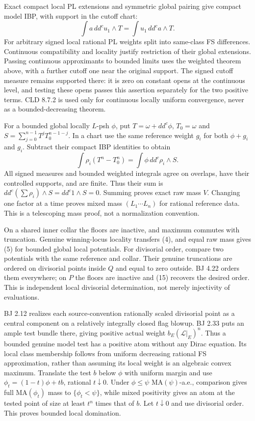 \documentclass[
  10pt,
]{article}
\begin{document}
Exact compact local PL extensions and symmetric global pairing give
compact model IBP, with support in the cutoff chart:
\[\int a\,dd^cu_1\wedge T=\int u_1\,dd^ca\wedge T. \tag{17}\] For
arbitrary signed local rational PL weights split into same-class FS
differences. Continuous compatibility and locality justify restriction
of their global extensions. Passing continuous approximants to bounded
limits uses the weighted theorem above, with a further cutoff one near
the original support. The signed cutoff measure remains supported there:
it is zero on constant opens at the continuous level, and testing these
opens passes this assertion separately for the two positive terms. CLD
8.7.2 is used only for continuous locally uniform convergence, never as
a bounded-decreasing theorem.

For a bounded global locally \(L\)-psh \(\phi\), put
\(T=\omega+dd^c\phi\), \(T_0=\omega\) and
\(S=\sum_{j=0}^{n-1}T^jT_0^{n-1-j}\). In a chart use the same reference
weight \(g_i\) for both \(\phi+g_i\) and \(g_i\). Subtract their compact
IBP identities to obtain
\[\int\rho_i(T^n-T_0^n)=\int\phi\,dd^c\rho_i\wedge S.\] All signed
measures and bounded weighted integrals agree on overlaps, have their
controlled supports, and are finite. Thus their sum is
\(dd^c(\sum\rho_i)\wedge S=dd^c1\wedge S=0\). Summing proves exact raw
mass \(V\). Changing one factor at a time proves mixed mass
\((L_1\cdots L_n)\) for rational reference data. This is a telescoping
mass proof, not a normalization convention.

On a shared inner collar the floors are inactive, and maximum commutes
with truncation. Genuine winning-locus locality transfers (4), and equal
raw mass gives (5) for bounded global local potentials. For divisorial
order, compare two potentials with the same reference and collar. Their
genuine truncations are ordered on divisorial points inside \(Q\) and
equal to zero outside. BJ 4.22 orders them everywhere; on \(P\) the
floors are inactive and (15) recovers the desired order. This is
independent local divisorial determination, not merely injectivity of
evaluations.

BJ 2.12 realizes each source-convention rationally scaled divisorial
point as a central component on a relatively integrally closed flag
blowup. BJ 2.33 puts an ample test bundle there, giving positive actual
weight \(b_E(\mathcal L|_E)^n\). Thus a bounded genuine model test has a
positive atom without any Dirac equation. Its local class membership
follows from uniform decreasing rational FS approximation, rather than
assuming its local weight is an algebraic convex maximum. Translate the
test \(b\) below \(\phi\) with uniform margin and use
\(\phi_t=(1-t)\phi+tb\), rational \(t\downarrow0\). Under
\(\phi\le\psi\) MA\((\psi)\)-a.e., comparison gives full MA\((\phi_t)\)
mass to \(\{\phi_t<\psi\}\), while mixed positivity gives an atom at the
tested point of size at least \(t^n\) times that of \(b\). Let
\(t\downarrow0\) and use divisorial order. This proves bounded local
domination.
\end{document}
